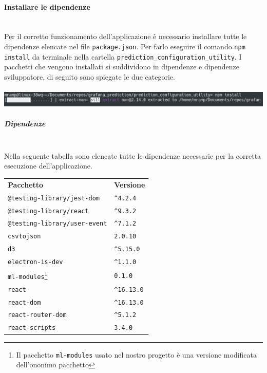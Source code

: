 \paragraph{Installare le dipendenze}\mbox{}\\ [1mm]
Per il corretto funzionamento dell'applicazione è necessario installare tutte le dipendenze elencate nel file \texttt{package.json}. Per farlo eseguire il comando \texttt{npm install} da terminale nella cartella \verb|prediction_configuration_utility|. I pacchetti che vengono installati si suddividono in dipendenze e dipendenze sviluppatore, di seguito sono spiegate le due categorie.
\\
\\
\includegraphics[width=\textwidth,height=\textheight,keepaspectratio]{img/packageInstallation.png}

\subparagraph*{Dipendenze}\mbox{}\\ [1mm]
Nella seguente tabella sono elencate tutte le dipendenze necessarie per la corretta esecuzione dell'applicazione.
	\setcounter{table}{0}
	\begin{longtable} {
		>{}p{65mm} 
		>{}p{30mm}
		}
    \rowcolor{gray!50}
    \textbf{Pacchetto} & \textbf{Versione} \TBstrut \\ [2mm]
    \verb|@testing-library/jest-dom| & \verb|^4.2.4|  \TBstrut \\ [2mm]
    \verb|@testing-library/react| & \verb|^9.3.2| \TBstrut \\ [2mm]
    \verb|@testing-library/user-event| & \verb|^7.1.2| \TBstrut \\ [2mm]
    \verb|csvtojson| & \verb|2.0.10| \TBstrut \\ [2mm]
    \verb|d3| & \verb|^5.15.0| \TBstrut \\ [2mm]
    \verb|electron-is-dev| & \verb|^1.1.0| \TBstrut \\ [2mm]
    \verb|ml-modules|\footnote{Il pacchetto \texttt{ml-modules} usato nel nostro progetto è una versione modificata dell'ononimo pacchetto} & \verb|0.1.0| \TBstrut \\ [2mm]
    \verb|react| & \verb|^16.13.0| \TBstrut \\ [2mm]
    \verb|react-dom| & \verb|^16.13.0| \TBstrut \\ [2mm]
    \verb|react-router-dom| & \verb|^5.1.2| \TBstrut \\ [2mm]
    \verb|react-scripts| & \verb|3.4.0| \TBstrut \\ [2mm]
    \end{longtable}
    
